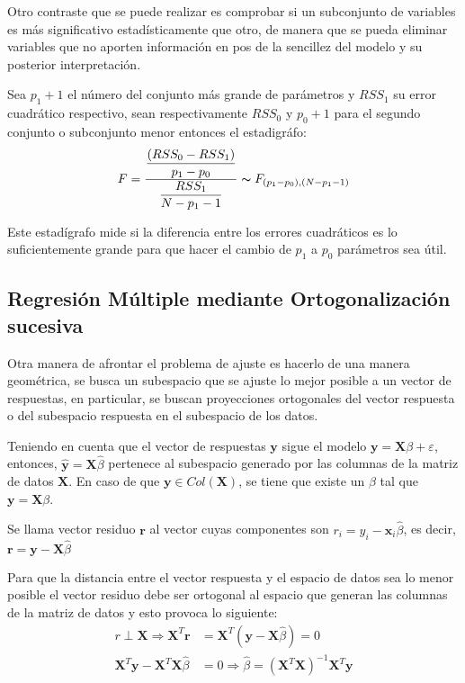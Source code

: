 \noindent Otro contraste que se puede realizar es comprobar si un subconjunto de variables es más significativo estadísticamente que otro, de manera que se pueda eliminar variables que no aporten información en pos de la sencillez del modelo y su posterior interpretación. 

\noindent Sea $p_1+1$ el número del conjunto más grande de parámetros y $RSS_1$ su error cuadrático respectivo, sean respectivamente $RSS_0$ y $p_0+1$ para el segundo conjunto o subconjunto menor entonces el estadigráfo:
\begin{equation}\label{ec.F}
F=\dfrac{\dfrac{(RSS_0-RSS_1)}{p_1-p_0}}{\dfrac{RSS_1}{N-p_1-1}} \thicksim F_{(p_1-p_0),(N-p_1-1)}
\end{equation}

\noindent Este estadígrafo mide si la diferencia entre los errores cuadráticos es lo suficientemente grande para que hacer el cambio de $p_1$ a $p_0$ parámetros sea útil. 

\subsection{Regresión Múltiple mediante Ortogonalización sucesiva }

\noindent Otra manera de afrontar el problema de ajuste es hacerlo de una manera geométrica, se busca un subespacio que se ajuste lo mejor posible a un vector de respuestas, en particular, se buscan proyecciones ortogonales del vector respuesta o del subespacio respuesta en el subespacio de los datos. 


\noindent Teniendo en cuenta que el vector de respuestas $\textbf{y}$ sigue el modelo $\textbf{y}=\textbf{X}\beta+\varepsilon$, entonces, $\hat{\textbf{y}}=\textbf{X}\hat{\beta}$ pertenece al subespacio generado por las columnas de la matriz de datos $\textbf{X}$. En caso de que $\textbf{y}\in Col(\textbf{X})$, se tiene que existe un $\beta$ tal que $\textbf{y}=\textbf{X}\beta$. 

\begin{defi}
Se llama vector residuo $\textbf{r}$ al vector cuyas componentes son $r_i=y_i-\textbf{x}_i\hat{\beta}$, es decir, $\textbf{r}=\textbf{y}-\textbf{X}\hat{\beta}$
\end{defi}

\noindent Para que la distancia entre el vector respuesta y el espacio de datos sea lo menor posible el vector residuo debe ser ortogonal al espacio que generan las columnas de la matriz de datos y esto provoca lo siguiente:
\begin{equation}
\begin{split}
r \perp \textbf{X}\Rightarrow \textbf{X}^T \textbf{r}&=\textbf{X}^T (\textbf{y}-\textbf{X}\hat{\beta})=0\\
\textbf{X}^T\textbf{y}-\textbf{X}^T\textbf{X}\hat{\beta}&=0\Rightarrow \hat{\beta}= (\textbf{X}^T\textbf{X})^{-1} \textbf{X}^T \textbf{y}
\end{split} 
\end{equation}

